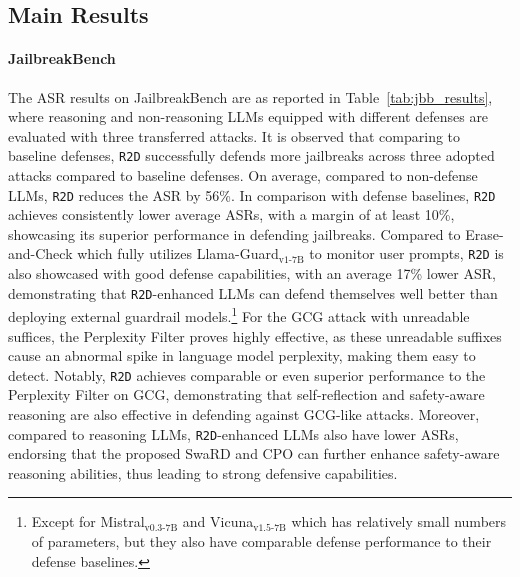 \subsection{Main Results}
\paragraph{JailbreakBench} The ASR results on JailbreakBench are as reported in Table~\ref{tab:jbb_results}, where reasoning and non-reasoning LLMs equipped with different defenses are evaluated with three transferred attacks. It is observed that comparing to baseline defenses, \texttt{R2D} successfully defends more jailbreaks across three adopted attacks compared to baseline defenses. On average, compared to non-defense LLMs, \texttt{R2D} reduces the ASR by 56\%. In comparison with defense baselines, \texttt{R2D} achieves consistently lower average ASRs, with a margin of at least 10\%, showcasing its superior performance in defending jailbreaks. Compared to Erase-and-Check which fully utilizes Llama-Guard$_\text{v1-7B}$ to monitor user prompts, \texttt{R2D} is also showcased with good defense capabilities, with an average 17\% lower ASR, demonstrating that \texttt{R2D}-enhanced LLMs can defend themselves well better than deploying external guardrail models.\footnote{Except for Mistral$_\text{v0.3-7B}$ and Vicuna$_\text{v1.5-7B}$ which has relatively small numbers of parameters, but they also have comparable defense performance to their defense baselines.} For the GCG attack with unreadable suffices, the Perplexity Filter proves highly effective, as these unreadable suffixes cause an abnormal spike in language model perplexity, making them easy to detect. Notably, \texttt{R2D} achieves comparable or even superior performance to the Perplexity Filter on GCG, demonstrating that self-reflection and safety-aware reasoning are also effective in defending against GCG-like attacks. Moreover, compared to reasoning LLMs, \texttt{R2D}-enhanced LLMs also have lower ASRs, endorsing that the proposed SwaRD and CPO can further enhance safety-aware reasoning abilities, thus leading to strong defensive capabilities.

